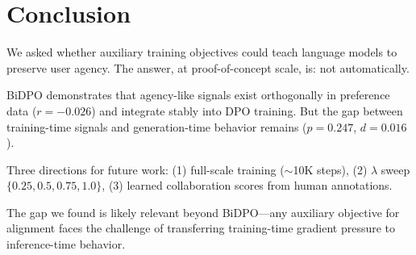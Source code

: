 \section{Conclusion}

We asked whether auxiliary training objectives could teach language models to preserve user agency. The answer, at proof-of-concept scale, is: not automatically.

BiDPO demonstrates that agency-like signals exist orthogonally in preference data ($r = -0.026$) and integrate stably into DPO training. But the gap between training-time signals and generation-time behavior remains ($p = 0.247$, $d = 0.016$).

Three directions for future work: (1) full-scale training ($\sim$10K steps), (2) $\lambda$ sweep $\{0.25, 0.5, 0.75, 1.0\}$, (3) learned collaboration scores from human annotations.

The gap we found is likely relevant beyond BiDPO---any auxiliary objective for alignment faces the challenge of transferring training-time gradient pressure to inference-time behavior.
